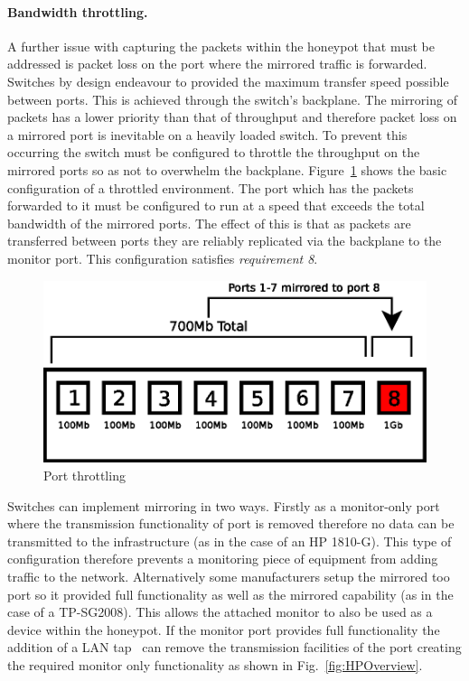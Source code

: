 \documentclass{llncs}
\begin{document}
\paragraph{Bandwidth throttling.} 
A further issue with capturing the packets within the honeypot that must be
addressed is packet loss on the port where the mirrored traffic is forwarded.
Switches by design endeavour to provided the maximum transfer speed possible
between ports. This is achieved through the switch's backplane. The mirroring
of packets has a lower priority than that of throughput and therefore packet
loss on a mirrored port is inevitable on a heavily loaded switch. To prevent
this occurring the switch must be configured to throttle the throughput on the
mirrored ports so as not to overwhelm the backplane.
Figure~\ref{fig:throttling} shows the basic configuration of a throttled
environment. The port which has the packets forwarded to it must be configured
to run at a speed that exceeds the total bandwidth of the mirrored ports. The
effect of this is that as packets are transferred between ports they are
reliably replicated via the backplane to the monitor port. This configuration
satisfies \emph{requirement 8}.

\begin{figure}[h]
\begin{center}
	\includegraphics[scale=0.4]{Images/Throttle.eps}
\caption{Port throttling\label{fig:throttling}}
\end{center}
\end{figure}

Switches can implement mirroring in two ways. Firstly as a monitor-only port
where the transmission functionality of port is removed therefore no data can
be transmitted to the infrastructure (as in the case of an HP 1810-G). This
type of configuration therefore prevents a monitoring piece of equipment from
adding traffic to the network. Alternatively some manufacturers setup the
mirrored too port so it provided full functionality as well as the mirrored
capability (as in the case of a TP-SG2008). This allows the attached monitor to
also be used as a device within the honeypot. If the monitor port provides full
functionality the addition of a LAN tap~\cite{RB:13} can remove the
transmission facilities of the port creating the required monitor only
functionality as shown in Fig.~\ref{fig:HPOverview}.
\end{document}
